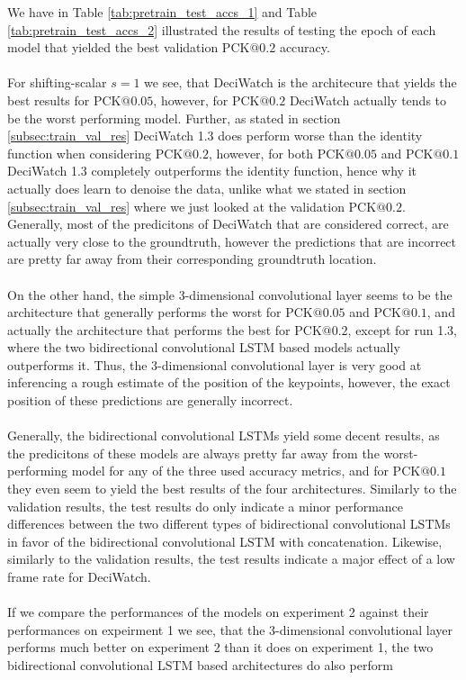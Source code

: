 \documentclass[./main.tex]{subfiles}
\begin{document}
\noindent We have in Table \ref{tab:pretrain_test_accs_1} and Table \ref{tab:pretrain_test_accs_2} illustrated the results of testing the epoch of each model that yielded the best validation PCK$@0.2$ accuracy.
\\
\\
For shifting-scalar $s = 1$ we see, that DeciWatch is the architecure that yields the best results for PCK$@0.05$, however, for PCK$@0.2$ DeciWatch actually tends to be the worst performing model. Further, as stated in section \ref{subsec:train_val_res} DeciWatch 1.3 does perform worse than the identity function when considering PCK$@0.2$, however, for both PCK$@0.05$ and PCK$@0.1$ DeciWatch 1.3 completely outperforms the identity function, hence why it actually does learn to denoise the data, unlike what we stated in section \ref{subsec:train_val_res} where we just looked at the validation PCK$@0.2$. Generally, most of the predicitons of DeciWatch that are considered correct, are actually very close to the groundtruth, however the predictions that are incorrect are pretty far away from their corresponding groundtruth location.
\\
\\
On the other hand, the simple 3-dimensional convolutional layer seems to be the architecture that generally performs the worst for PCK$@0.05$ and PCK$@0.1$, and actually the architecture that performs the best for PCK$@0.2$, except for run 1.3, where the two bidirectional convolutional LSTM based models actually outperforms it. Thus, the 3-dimensional convolutional layer is very good at inferencing a rough estimate of the position of the keypoints, however, the exact position of these predictions are generally incorrect.
\\
\\
Generally, the bidirectional convolutional LSTMs yield some decent results, as the predicitons of these models are always pretty far away from the worst-performing model for any of the three used accuracy metrics, and for PCK$@0.1$ they even seem to yield the best results of the four architectures. Similarly to the validation results, the test results do only indicate a minor performance differences between the two different types of bidirectional convolutional LSTMs in favor of the bidirectional convolutional LSTM with concatenation. Likewise, similarly to the validation results, the test results indicate a major effect of a low frame rate for DeciWatch. 
\\
\\
If we compare the performances of the models on experiment 2 against their performances on expeirment 1 we see, that the 3-dimensional convolutional layer performs much better on experiment 2 than it does on experiment 1, the two bidirectional convolutional LSTM based architectures do also perform 
\end{document}
